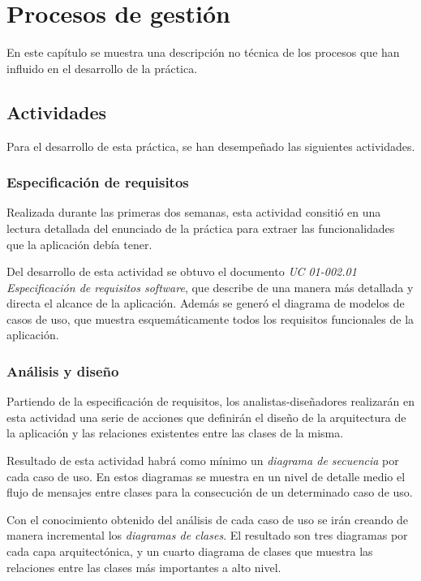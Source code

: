 \chapter{Procesos de gestión}

En este capítulo se muestra una descripción no técnica de los procesos que han
influido en el desarrollo de la práctica.

\section{Actividades}

Para el desarrollo de esta práctica, se han desempeñado las siguientes
actividades.

\subsection*{Especificación de requisitos}

Realizada durante las primeras dos semanas, esta actividad consitió en una
lectura detallada del enunciado de la práctica para extraer las funcionalidades
que la aplicación debía tener.

Del desarrollo de esta actividad se obtuvo el documento \textit{UC 01-002.01
Especificación de requisitos software}, que describe de una manera más
detallada y directa el alcance de la aplicación. Además se generó el diagrama
de modelos de casos de uso, que muestra esquemáticamente todos los requisitos
funcionales de la aplicación.

\subsection*{Análisis y diseño}

Partiendo de la especificación de requisitos, los analistas-diseñadores
realizarán en esta actividad una serie de acciones que definirán el diseño de
la arquitectura de la aplicación y las relaciones existentes entre las clases
de la misma.

Resultado de esta actividad habrá como mínimo un \textit{diagrama de secuencia}
por cada caso de uso. En estos diagramas se muestra en un nivel de detalle medio
el flujo de mensajes entre clases para la consecución de un determinado caso de
uso.

Con el conocimiento obtenido del análisis de cada caso de uso se irán creando de
manera incremental los \textit{diagramas de clases}. El resultado son tres
diagramas por cada capa arquitectónica, y un cuarto diagrama de clases que
muestra las relaciones entre las clases más importantes a alto nivel.

